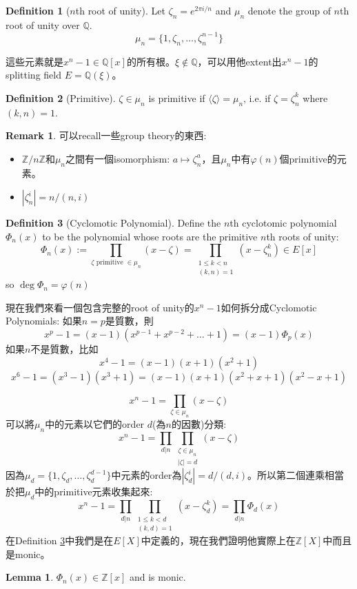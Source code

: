 \documentclass{article}
\theoremstyle{definition}
\newtheorem{lem}{Lemma}
\newtheorem{dfn}{Definition}
\newtheorem{rem}{Remark}
\newcommand{\QQ}{\mathbb Q}
\newcommand{\ZZ}{\mathbb Z}
\begin{document}
\begin{dfn}[$n$th root of unity]
	Let $\zeta_n=e^{2\pi i/n}$ and $\mu_n$ denote the group of $n$th root of unity over $\QQ$.
	\[\mu_n=\{1,\zeta_n,\dots,\zeta_n^{n-1}\}\]
\end{dfn}
這些元素就是$x^n-1\in\QQ[x]$的所有根。$\xi\notin\QQ$，可以用他extent出$x^n-1$的splitting field $E=\QQ(\xi)$。

\begin{dfn}[Primitive]
	$\zeta\in \mu_n$ is primitive if $\langle\zeta\rangle=\mu_n$, i.e. if $\zeta=\zeta_n^k$ where $(k,n)=1$.
\end{dfn}

\begin{rem}
	可以recall一些group theory的東西:
	\begin{itemize}
		\item $\ZZ/n\ZZ$和$\mu_n$之間有一個isomorphism: $a\mapsto \zeta_n^a$，且$\mu_n$中有$\varphi(n)$個primitive的元素。
		\item $|\zeta_n^i|=n/(n,i)$
	\end{itemize}
\end{rem}

\begin{dfn}[Cyclomotic Polynomial]\label{cyclomotic_polynomial}
	Define the $n$th cyclotomic polynomial $\Phi_n(x)$ to be the polynomial whose roots are the primitive $n$th roots of unity:
	\[
		\Phi_n(x):=\prod_{\zeta\text{ primitive }\in \mu_n}(x-\zeta)=\prod_{\substack{ 1\le k < n \\ (k,n)=1}}(x-\zeta_n^k)\in E[x]
	\]
	so $\deg \Phi_n = \varphi(n)$
\end{dfn}

現在我們來看一個包含完整的root of unity的$x^n-1$如何拆分成Cyclomotic Polynomials:
如果$n=p$是質數，則
\[x^p-1=(x-1)(x^{p-1}+x^{p-2}+\dots+1)=(x-1)\Phi_p(x)\]
如果$n$不是質數，比如
\[x^4-1=(x-1)(x+1)(x^2+1)\]
\[x^6-1=(x^3-1)(x^3+1)=(x-1)(x+1)(x^2+x+1)(x^2-x+1)\]

\[
	x^n-1=\prod_{\zeta\in\mu_n}(x-\zeta)
\]
可以將$\mu_n$中的元素以它們的order $d$(為$n$的因數)分類:
\[
	x^n-1=\prod_{d|n}\prod_{\substack{\zeta\in\mu_n\\|\zeta|=d}}(x-\zeta)
\]
因為$\mu_d=\{1,\zeta_d,\dots,\zeta_{d}^{d-1}\}$中元素的order為$|\zeta_d^i|=d/(d,i)$。所以第二個連乘相當於把$\mu_d$中的primitive元素收集起來:
\[
	x^n-1=\prod_{d|n}\prod_{\substack{1\le k<d\\(k,d)=1}}(x-\zeta_d^k)=\prod_{d|n} \Phi_d(x)
\]
在Definition \ref{cyclomotic_polynomial}中我們是在$E[X]$中定義的，現在我們證明他實際上在$\ZZ[X]$中而且是monic。
\begin{lem}
	$\Phi_n(x) \in \mathbb{Z}[x]$ and is monic.
\end{lem}
\end{document}
